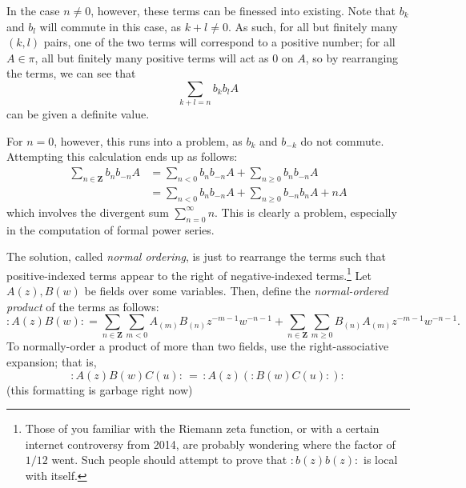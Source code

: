 \documentclass{article}
\newcommand{\ZZ}{\mathbold{Z}}
\begin{document}
In the case $n \ne 0$, however, these terms can be finessed into existing.  Note that $b_k$ and $b_l$ will commute in this case, as $k+l \ne 0$.  As such, for all but finitely many $(k,l)$ pairs, one of the two terms will correspond to a positive number; for all $A \in \pi$, all but finitely many positive terms will act as $0$ on $A$, so by rearranging the terms, we can see that
\[\sum_{k+l=n}b_kb_lA \]
can be given a definite value.

For $n=0$, however, this runs into a problem, as $b_k$ and $b_{-k}$ do not commute.  Attempting this calculation ends up as follows:
\begin{align*}
  \sum_{n \in \ZZ}b_nb_{-n}A&=\sum_{n < 0}b_nb_{-n}A + \sum_{n \ge 0}b_nb_{-n}A\\
  &=\sum_{n<0}b_nb_{-n}A+\sum_{n \ge 0}b_{-n}b_nA+nA
\end{align*}
which involves the divergent sum $\sum_{n=0}^\infty n$.  This is clearly a problem, especially in the computation of formal power series.

The solution, called \textit{normal ordering}, is just to rearrange the terms such that positive-indexed terms appear to the right of negative-indexed terms.\footnote{Those of you familiar with the Riemann zeta function, or with a certain internet controversy from 2014, are probably wondering where the factor of $1/12$ went.  Such people should attempt to prove that $:b(z)b(z):$ is local with itself.}  Let $A(z),B(w)$ be fields over some variables.  Then, define the \textit{normal-ordered product} of the terms as follows:
\[:A(z)B(w): = \sum_{n \in \ZZ}\sum_{m<0}A_{(m)}B_{(n)}z^{-m-1}w^{-n-1}+\sum_{n \in \ZZ}\sum_{m \ge 0}B_{(n)}A_{(m)}z^{-m-1}w^{-n-1}. \]
To normally-order a product of more than two fields, use the right-associative expansion; that is,
\[: A(z)B(w)C(u) :\, =\, : A(z) (:B(w)C(u): ): \]
(this formatting is garbage right now)
\end{document}
